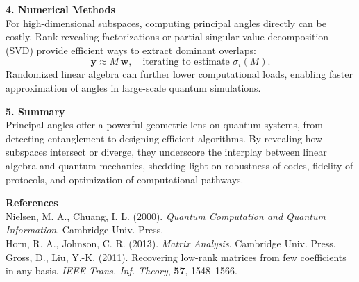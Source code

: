 \begin{technical}
\vspace{0.5em}
\noindent\textbf{4. Numerical Methods}\\[0.5em]
For high-dimensional subspaces, computing principal angles directly can be costly. Rank-revealing factorizations or partial singular value decomposition (SVD) provide efficient ways to extract dominant overlaps:
\[
\mathbf{y} \approx M \,\mathbf{w}, \quad\text{iterating to estimate } \sigma_i(M).
\]
Randomized linear algebra can further lower computational loads, enabling faster approximation of angles in large-scale quantum simulations. 

\vspace{0.5em}
\noindent\textbf{5. Summary}\\[0.5em]
Principal angles offer a powerful geometric lens on quantum systems, from detecting entanglement to designing efficient algorithms. By revealing how subspaces intersect or diverge, they underscore the interplay between linear algebra and quantum mechanics, shedding light on robustness of codes, fidelity of protocols, and optimization of computational pathways.

\vspace{0.5em}
\noindent\textbf{References}\\
Nielsen, M. A., Chuang, I. L. (2000). \emph{Quantum Computation and Quantum Information}. Cambridge Univ. Press.\\
Horn, R. A., Johnson, C. R. (2013). \emph{Matrix Analysis}. Cambridge Univ. Press.\\
Gross, D., Liu, Y.-K. (2011). Recovering low-rank matrices from few coefficients in any basis. \emph{IEEE Trans. Inf. Theory}, \textbf{57}, 1548--1566.
\end{technical}
